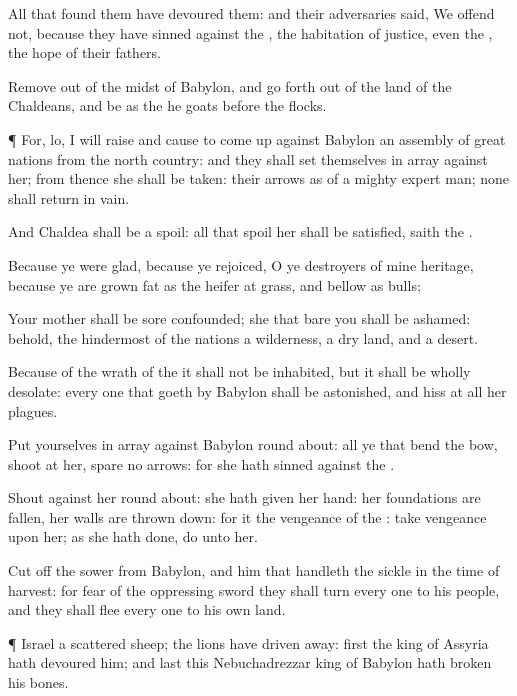 {All that
found them have
devoured them: and their
adversaries
said, We
offend not, because they have
sinned against the
{}, the
habitation of
justice, even the
{}, the
hope of their
fathers.

Remove out of the
midst of
Babylon, and go
forth out of the
land of the
Chaldeans, and be as the he
goats
before the
flocks.


\par }{\PP {}¶ For, lo, I will
raise and cause to come
up against
Babylon an
assembly of
great
nations from the
north
country: and they shall set themselves in
array against her; from thence she shall be
taken: their
arrows
{} as of a
mighty expert
man; none shall
return in
vain.

And
Chaldea shall be a
spoil: all that
spoil her shall be
satisfied,
saith the
{}.

Because ye were
glad, because ye
rejoiced, O ye
destroyers of mine
heritage, because ye are grown
fat as the
heifer at
grass, and
bellow as
bulls;

Your
mother shall be
sore
confounded; she that
bare you shall be
ashamed: behold, the
hindermost of the
nations
{} a
wilderness, a dry
land, and a
desert.

Because of the
wrath of the
{} it shall not be
inhabited, but it shall be wholly
desolate: every one that
goeth by
Babylon shall be
astonished, and
hiss at all her
plagues.

Put yourselves in
array against
Babylon round
about: all ye that
bend the
bow,
shoot at her,
spare no
arrows: for she hath
sinned against the
{}.

Shout against her round
about: she hath
given her
hand: her
foundations are
fallen, her
walls are thrown
down: for it
{} the
vengeance of the
{}: take
vengeance upon her; as she hath
done,
do unto her.

Cut
off the
sower from
Babylon, and him that
handleth the
sickle in the
time of
harvest: for
fear of the
oppressing
sword they shall
turn every
one to his
people, and they shall
flee every
one to his own
land.


\par }{\PP {}¶
Israel
{} a
scattered
sheep; the
lions have driven
{}
away:
first the
king of
Assyria hath
devoured him; and
last this
Nebuchadrezzar
king of
Babylon hath broken his
bones.

}
